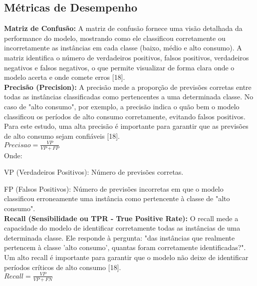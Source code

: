 \documentclass[conference]{IEEEtran}
\begin{document}
\subsection{Métricas de Desempenho}

\textbf{Matriz de Confusão:} A matriz de confusão fornece uma visão detalhada da performance do modelo, mostrando como ele classificou corretamente ou incorretamente as instâncias em cada classe (baixo, médio e alto consumo). A matriz identifica o número de verdadeiros positivos, falsos positivos, verdadeiros negativos e falsos negativos, o que permite visualizar de forma clara onde o modelo acerta e onde comete erros [18]. \\
    
\textbf{Precisão (Precision):} A precisão mede a proporção de previsões corretas entre todas as instâncias classificadas como pertencentes a uma determinada classe. No caso de "alto consumo", por exemplo, a precisão indica o quão bem o modelo classificou os períodos de alto consumo corretamente, evitando falsos positivos. Para este estudo, uma alta precisão é importante para garantir que as previsões de alto consumo sejam confiáveis [18]. \\

    \begin{math} Precisao = \frac{VP}{VP + FP}
    \end{math}\\

Onde: 

VP (Verdadeiros Positivos): Número de previsões corretas. 

FP (Falsos Positivos): Número de previsões incorretas em que o modelo classificou erroneamente uma instância como pertencente à classe de "alto consumo". \\
    
\textbf{Recall (Sensibilidade ou TPR - True Positive Rate):} O recall mede a capacidade do modelo de identificar corretamente todas as instâncias de uma determinada classe. Ele responde à pergunta: "das instâncias que realmente pertencem à classe 'alto consumo', quantas foram corretamente identificadas?". Um alto recall é importante para garantir que o modelo não deixe de identificar períodos críticos de alto consumo [18]. \\

    \begin{math} Recall = \frac{VP}{VP + FN}
    \end{math} \\
    
\end{document}

